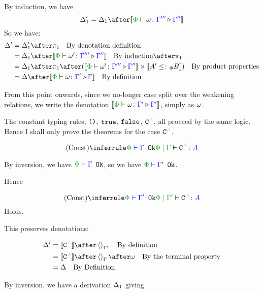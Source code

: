 \documentclass{report}
\begin{document}
        By induction, we have
        \begin{equation}
            \D_1' = \D_1 \after \deno{\ewrel{\P}{\w}{\G'''}{\G''}}
        \end{equation}
        So we have:
        \begin{align*}
            \D' &= \D_1' \after \p\qt{By denotation definition}\\
            & = \D_1\after\deno{\ewrel{\P}{\w'}{\G'''}{\G''}}\qt{By induction}\after\p \\
            & = \D_1\after\p\after(\deno{\ewrel{\P}{\w'}{\G'''}{\G''}}\times\deno{A' \subtypep B})\qt{By product properties}\\
            & = \D\after\deno{\ewrel{\P}{\w}{\G'}{\G}}\qt{By definition}
        \end{align*}


    From this point onwards, since we no-longer case split over the weakening relations, we write the denotation $\deno{\ewrel{\P}{\w}{\G'}{\G'}}$, simply as $\omega$.


    The constant typing rules, $\texttt{()}$, $\texttt{true}$, $\texttt{false}$, $\const{A}$, all proceed by the same logic. Hence I shall only prove the theorems for the case $\const{A}$.

    \begin{equation}
        \ntreeruleI{Const}{\wellformedok{\P}{\G}}{\gpetyperelation{\const{A}}{A}}
    \end{equation}

    By inversion, we have $\wellformedok{\P}{\G}$, so we have $\wellformedok{\P}{\G'}$.

    Hence

    \begin{equation}
        \ntreeruleI{Const}{\wellformedok{\P}{\G'}}{\etyperelation{\P}{\G'}{\const{A}}{A}}
    \end{equation}
    Holds.

    This preserves denotations:


    \begin{align*}
        \D' & = \deno{\const{A}} \after \term{\G'}\qt{By definition}\\
        & = \deno{\const{A}} \after \term{\G}\after \w \qt{By the terminal property}\\
        & = \D\qt{By Definition}\\
    \end{align*}


    By inversion, we have a derivation $\Delta_1$ giving
\end{document}
